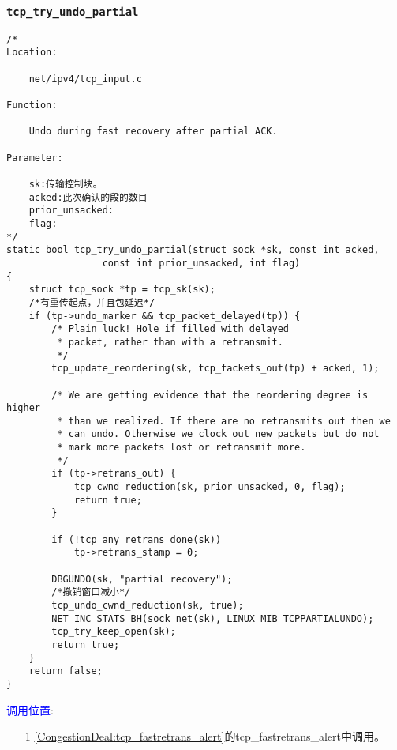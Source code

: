         \subsubsection{\texttt{tcp_try_undo_partial}}
            \label{CongestionControlWindowUndo:tcp_try_undo_partial}
\begin{verbatim}
/* 
Location:

    net/ipv4/tcp_input.c

Function:

    Undo during fast recovery after partial ACK.

Parameter:

    sk:传输控制块。
    acked:此次确认的段的数目
    prior_unsacked:
    flag:
*/
static bool tcp_try_undo_partial(struct sock *sk, const int acked,
                 const int prior_unsacked, int flag)
{
    struct tcp_sock *tp = tcp_sk(sk);
    /*有重传起点，并且包延迟*/
    if (tp->undo_marker && tcp_packet_delayed(tp)) {
        /* Plain luck! Hole if filled with delayed
         * packet, rather than with a retransmit.
         */
        tcp_update_reordering(sk, tcp_fackets_out(tp) + acked, 1);

        /* We are getting evidence that the reordering degree is higher
         * than we realized. If there are no retransmits out then we
         * can undo. Otherwise we clock out new packets but do not
         * mark more packets lost or retransmit more.
         */
        if (tp->retrans_out) {
            tcp_cwnd_reduction(sk, prior_unsacked, 0, flag);
            return true;
        }

        if (!tcp_any_retrans_done(sk))
            tp->retrans_stamp = 0;

        DBGUNDO(sk, "partial recovery");
        /*撤销窗口减小*/
        tcp_undo_cwnd_reduction(sk, true);
        NET_INC_STATS_BH(sock_net(sk), LINUX_MIB_TCPPARTIALUNDO);
        tcp_try_keep_open(sk);
        return true;
    }
    return false;
}
\end{verbatim}

        \textcolor{blue}{调用位置}:

            \begin{enumerate}
                \item[1]        \ref{CongestionDeal:tcp_fastretrans_alert}的tcp\_fastretrans\_alert中调用。
            \end{enumerate}

